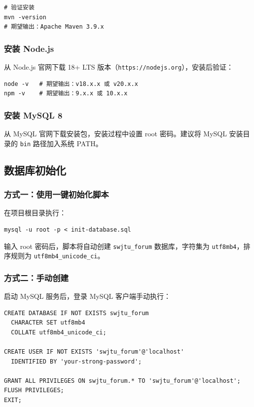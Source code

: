 \documentclass[bwprint]{report}
\begin{document}
\begin{lstlisting}
# 验证安装
mvn -version
# 期望输出：Apache Maven 3.9.x
\end{lstlisting}

\subsubsection{安装 Node.js}

从 Node.js 官网下载 18+ LTS 版本（\texttt{https://nodejs.org}），安装后验证：

\begin{lstlisting}
node -v   # 期望输出：v18.x.x 或 v20.x.x
npm -v    # 期望输出：9.x.x 或 10.x.x
\end{lstlisting}

\subsubsection{安装 MySQL 8}

从 MySQL 官网下载安装包，安装过程中设置 root 密码。建议将 MySQL 安装目录的 \texttt{bin} 路径加入系统 PATH。

\subsection{数据库初始化}

\subsubsection{方式一：使用一键初始化脚本}

在项目根目录执行：

\begin{lstlisting}
mysql -u root -p < init-database.sql
\end{lstlisting}

输入 root 密码后，脚本将自动创建 \texttt{swjtu\_forum} 数据库，字符集为 \texttt{utf8mb4}，排序规则为 \texttt{utf8mb4\_unicode\_ci}。

\subsubsection{方式二：手动创建}

启动 MySQL 服务后，登录 MySQL 客户端手动执行：

\begin{lstlisting}
CREATE DATABASE IF NOT EXISTS swjtu_forum
  CHARACTER SET utf8mb4
  COLLATE utf8mb4_unicode_ci;

CREATE USER IF NOT EXISTS 'swjtu_forum'@'localhost'
  IDENTIFIED BY 'your-strong-password';

GRANT ALL PRIVILEGES ON swjtu_forum.* TO 'swjtu_forum'@'localhost';
FLUSH PRIVILEGES;
EXIT;
\end{lstlisting}
\end{document}
